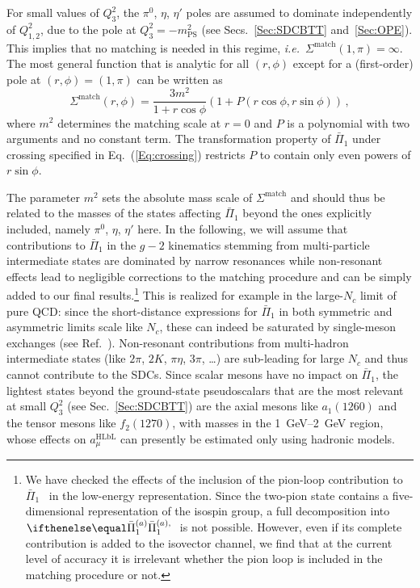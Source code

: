 For small values of $Q_3^2$, the $\pi^0$, $\eta$, $\eta'$ poles are assumed to dominate independently of $Q_{1,2}^2$, due to the pole at $Q_3^2 = -m_\text{PS}^2$ (see Secs.~\ref{Sec:SDCBTT} and~\ref{Sec:OPE}). This implies that no matching is needed in this regime, {\it i.e.}\ $\Sigma^\text{match}(1,\pi) = \infty$. The most general function that is analytic for all $(r,\phi)$ except for a (first-order) pole at $(r,\phi) = (1,\pi)$ can be written as
\begin{equation}
\Sigma^\text{match}(r,\phi) = \frac{3m^2}{1+r \cos \phi}\left(1 + P(r \cos \phi, r \sin \phi)\right)\, ,
\label{Eq:MatchSc}
\end{equation}
where $m^2$ determines the matching scale at $r = 0$ and $P$ is a polynomial with two arguments and no constant term. The transformation property of $\bar{\Pi}_1$ under crossing specified in Eq.~(\ref{Eq:crossing}) restricts $P$ to contain only even powers of $r \sin \phi$.

The parameter $m^2$ sets the absolute mass scale of $\Sigma^\text{match}$ and should thus be related to the masses of the states affecting $\bar{\Pi}_1$ beyond the ones explicitly included, namely $\pi^0$, $\eta$, $\eta'$ here.
In the following, we will assume that contributions to $\bar{\Pi}_1$ in the $g-2$ kinematics stemming from multi-particle intermediate states are dominated by narrow resonances while non-resonant effects lead to negligible corrections to the matching procedure and can be simply added to our final results.\footnote{We have checked the effects of the inclusion of the pion-loop contribution to $\bar{\Pi}_1$~\cite{BTT3} in the low-energy representation. Since the two-pion state contains a five-dimensional representation of the isospin group, a full decomposition into $\PiPS$ is not possible. However, even if its complete contribution is added to the isovector channel, we find that at the current level of accuracy it is irrelevant whether the pion loop is included in the matching procedure or not.} This is realized for example in the large-$N_c$ limit of pure QCD: since the short-distance expressions for $\bar{\Pi}_1$ in both symmetric and asymmetric limits scale like $N_c$, these can indeed be saturated by single-meson exchanges (see Ref.~\cite{deRafael}). Non-resonant contributions from multi-hadron intermediate states (like $2\pi$, $2 K$, $\pi\eta$, $3\pi$, \dots) are sub-leading for large $N_c$ and thus cannot contribute to the SDCs. Since scalar mesons have no impact on $\bar{\Pi}_1$, the lightest states beyond the ground-state pseudoscalars that are the most relevant at small $Q_3^2$ (see Sec.~\ref{Sec:SDCBTT}) are the axial mesons like $a_1(1260)$ and the tensor mesons like $f_2(1270)$, with masses in the \SIrange[range-units=single, range-phrase=--]{1}{2}{\GeV} region, whose effects on $a_\mu^\text{HLbL}$ can presently be estimated only using hadronic models.

